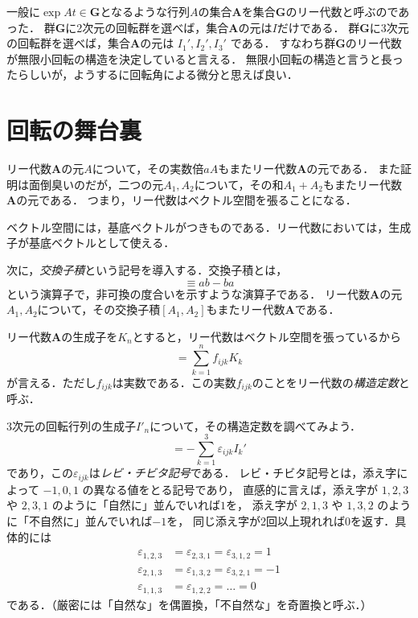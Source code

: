\documentclass{jsbook}
\newcommand{\keyword}[1]{\emph{#1}}
\newcommand{\bg}[1]{\mathbf{#1}}
\begin{document}
一般に$\exp At\in\bg{G}$となるような行列$A$の集合$\bg{A}$を集合$\bg{G}$のリー代数と呼ぶのであった．
群$\bg{G}$に2次元の回転群を選べば，集合$\bg{A}$の元は$I$だけである．
群$\bg{G}$に3次元の回転群を選べば，集合$\bg{A}$の元は $I_1',I_2',I_3'$ である．
すなわち群$\bg{G}$のリー代数が無限小回転の構造を決定していると言える．
無限小回転の構造と言うと長ったらしいが，ようするに回転角による微分と思えば良い．

\section{回転の舞台裏}

リー代数$\bg{A}$の元$A$について，その実数倍$aA$もまたリー代数$\bg{A}$の元である．
また証明は面倒臭いのだが，二つの元$A_1,A_2$について，その和$A_1+A_2$もまたリー代数$\bg{A}$の元である．
つまり，リー代数はベクトル空間を張ることになる．

ベクトル空間には，基底ベクトルがつきものである．リー代数においては，生成子が基底ベクトルとして使える．

次に，\keyword{交換子積}という記号を導入する．交換子積とは，
\begin{equation}
[a,b]\equiv ab-ba
\end{equation}
という演算子で，非可換の度合いを示すような演算子である．
リー代数$\bg{A}$の元$A_1,A_2$について，その交換子積$[A_1,A_2]$もまたリー代数$\bg{A}$である．

リー代数$\bg{A}$の生成子を$K_n$とすると，リー代数はベクトル空間を張っているから
\begin{equation}
[K_i,K_j]=\sum_{k=1}^nf_{ijk}K_k
\end{equation}
が言える．ただし$f_{ijk}$は実数である．この実数$f_{ijk}$のことをリー代数の\keyword{構造定数}と呼ぶ．

3次元の回転行列の生成子$I'_n$について，その構造定数を調べてみよう．
\begin{equation}
[I_i',I_j']=-\sum_{k=1}^3\varepsilon_{ijk}I_k'
\end{equation}
であり，この$\varepsilon_{ijk}$は\keyword{レビ・チビタ記号}である．
レビ・チビタ記号とは，添え字によって $-1,0,1$ の異なる値をとる記号であり，
直感的に言えば，添え字が $1,2,3$ や $2,3,1$ のように「自然に」並んでいれば$1$を，
添え字が $2,1,3$ や $1,3,2$ のように「不自然に」並んでいれば$-1$を，
同じ添え字が2回以上現れれば$0$を返す．具体的には
\begin{align}
\varepsilon_{1,2,3}&=\varepsilon_{2,3,1}=\varepsilon_{3,1,2}=1\\
\varepsilon_{2,1,3}&=\varepsilon_{1,3,2}=\varepsilon_{3,2,1}=-1\\
\varepsilon_{1,1,3}&=\varepsilon_{1,2,2}=\dots=0
\end{align}
である．（厳密には「自然な」を偶置換，「不自然な」を奇置換と呼ぶ．）
\end{document}
